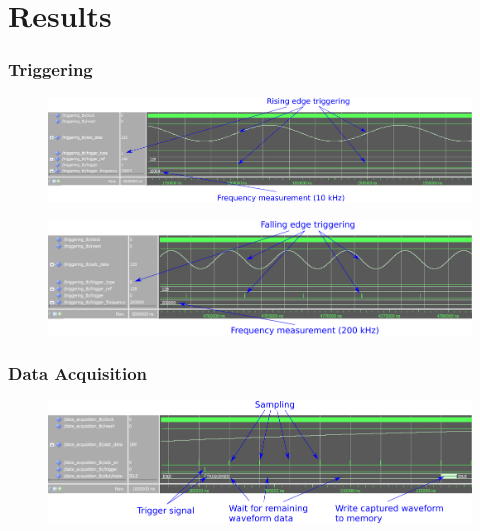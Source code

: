 \documentclass[pdf]{beamer}
\begin{document}
\section{Results}

\begin{frame}
\frametitle{Triggering}
\begin{figure}[!htb]
  \includegraphics[width=\linewidth]{test-results/trigger_test_rising_10kHz.png}
\end{figure}
\begin{figure}[!htb]
  \includegraphics[width=\linewidth]{test-results/trigger_test_falling_200kHz.png}
\end{figure}
\end{frame}

\begin{frame}
\frametitle{Data Acquisition}
\begin{figure}[!htb]
  \includegraphics[width=\linewidth]{test-results/data_acquisition_test.png}
\end{figure}
\end{frame}
\end{document}
